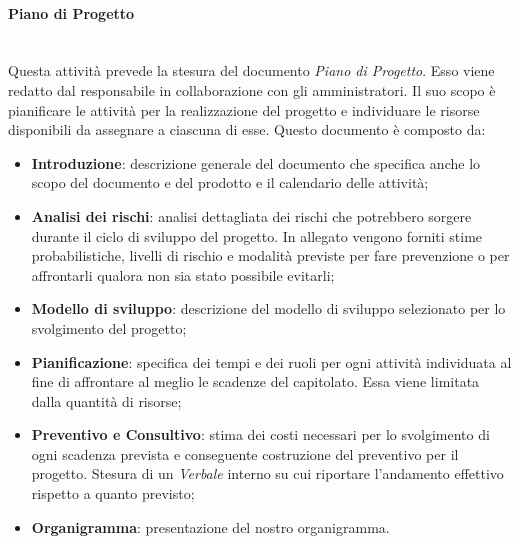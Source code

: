 \paragraph{Piano di Progetto}\mbox{}\\ [1mm]
Questa attività prevede la stesura del documento \textit{Piano di Progetto}. Esso viene redatto dal responsabile in collaborazione con gli amministratori. Il suo scopo è pianificare le attività per la realizzazione del progetto e individuare le risorse disponibili da assegnare a ciascuna di esse.
Questo documento è composto da:
\begin{itemize}
	\item \textbf{Introduzione}: descrizione generale del documento che specifica anche lo scopo del documento e del prodotto e il calendario delle attività;
	\item \textbf{Analisi dei rischi}: analisi dettagliata dei rischi che potrebbero sorgere durante il ciclo di sviluppo del progetto. In allegato vengono forniti stime probabilistiche, livelli di rischio e modalità previste per fare prevenzione o per affrontarli qualora non sia stato possibile evitarli;
	\item \textbf{Modello di sviluppo}\glo: descrizione del modello di sviluppo selezionato per lo svolgimento del progetto;
	\item \textbf{Pianificazione}: specifica dei tempi e dei ruoli per ogni attività individuata al fine di affrontare al meglio le scadenze del capitolato\glo. Essa viene limitata dalla quantità di risorse;
	\item \textbf{Preventivo e Consultivo}: stima dei costi necessari per lo svolgimento di ogni scadenza prevista e conseguente costruzione del preventivo per il progetto. Stesura di un \textit{Verbale} interno su cui riportare l'andamento effettivo rispetto a quanto previsto;
	\item \textbf{Organigramma}: presentazione del nostro organigramma.
\end{itemize}

